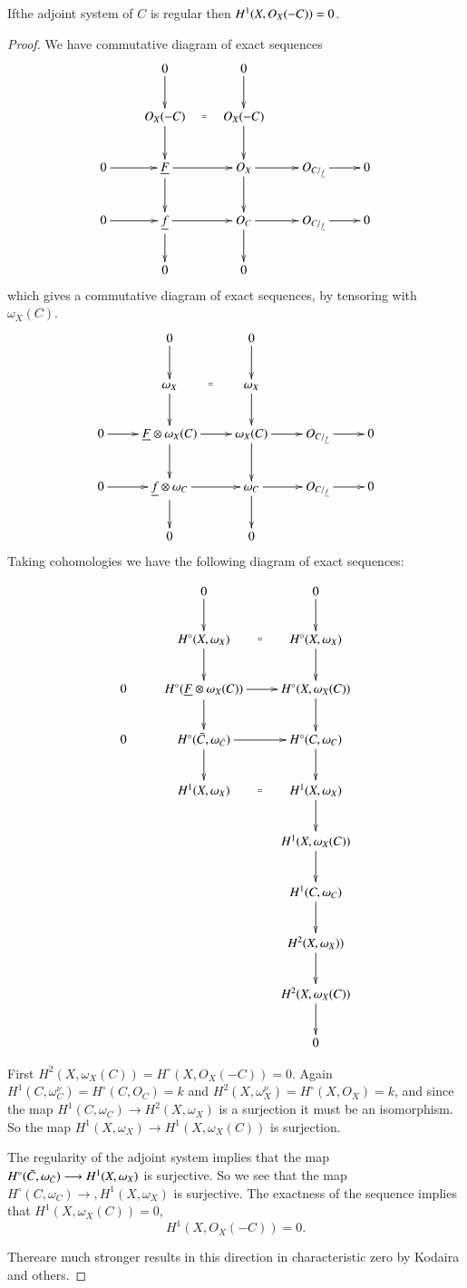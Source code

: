 \begin{Prop*}
If\pageoriginale the adjoint system of $C$ is regular then $H^1(X,\break O_X
(-C))=0$.
\end{Prop*}

\begin{proof}
We have commutative diagram of exact sequences
\[
\xymatrix{
& 0 \ar[d] & 0 \ar[d] & &\\
& O_X(-C) \ar[d] \ar @{} [r] |{=} & O_X(-C) \ar[d] & &\\
0 \ar[r] & \underline{F} \ar[d] \ar[r] & O_X \ar[d] \ar[r] &
O_{C/_{\underline{f}}} \ar[r] & 0\\
0 \ar[r] & \underline{f} \ar[d] \ar[r] & O_C \ar[d] \ar[r] &
O_{C/_{\underline{f}}} \ar[r] & 0\\
& 0 & 0 & & 
}
\] 
which gives a commutative diagram of exact sequences, by tensoring
with $\omega_X(C)$.
\[
\xymatrix{
& 0 \ar[d] & 0 \ar[d]\\
& \omega_X \ar[d] \ar @{} [r] |{=} & \omega_X \ar[d] & &\\
0 \ar[r] & \underline{F}\otimes\omega_X(C) \ar[d] \ar[r] & \omega_X(C)
\ar[d] \ar[r] & O_{C/_{\underline{f}}} \ar[r] & 0\\
0 \ar[r] & \underline{f}\otimes\omega_C \ar[d] \ar[r] & \omega_C
\ar[d] \ar[r] & O_{C/_{\underline{f}}} \ar[r] & 0\\
& 0 & 0 & &
}
\]
Taking cohomologies we have the following diagram of exact
sequen\-ces:
\newpage

\[
\xymatrix{
& 0 \ar[d] & 0 \ar[d]\\
& H^\circ(X,\omega_X) \ar[d] \ar @{} [r] |{=} & H^\circ(X,\omega_X)
\ar[d]\\
0 & H^\circ(\underline{F}\otimes\omega_X(C)) \ar[d] \ar[r] &
H^\circ(X,\omega_X(C)) \ar[d]\\
0 & H^\circ(\bar{C},\omega_{\bar{C}}) \ar[d] \ar[r] & H^\circ(C,
\omega_C) \ar[d]\\
& H^1(X,\omega_X) \ar @{} [r] |{=} & H^1(X,\omega_X) \ar[d]\\
& & H^1(X,\omega_X(C)) \ar[d]\\
& & H^1(C,\omega_C) \ar[d]\\
& & H^2(X,\omega_X)) \ar[d]\\
& & H^2(X,\omega_X(C)) \ar[d]\\
& & 0 
}
\]\pageoriginale

First $H^2(X,\omega_X(C))=H^\circ(X,O_X(-C))=0$. Again $H^1(C,
\omega_C^\nu)=H^\circ(C,O_C)=k$ and
$H^2(X,\omega_X^\nu)=H^\circ(X,O_X)=k$, and since the map $H^1(C,
\omega_C)\longrightarrow H^2(X,\omega_X)$ is a surjection it must be
an isomorphism. So the map $H^1(X,\omega_X)\longrightarrow H^1(X,
\omega_X(C))$ is surjection.

The regularity of the adjoint system implies that the map
$H^\circ(\bar{C},\break\omega_{\bar{C}})\longrightarrow H^1(X,\omega_X)$ is
surjective. So we see that the map $H^\circ(C,\omega_C)
\longrightarrow, H^1(X,\omega_X)$ is surjective. The exactness of the
sequence implies that $H^1(X,\omega_X(C))=0$, \ie
$$
H^1(X,O_X(-C))=0.
$$ 

There\pageoriginale are much stronger results in this direction in
characteristic zero by Kodaira \cite{key2} and others. 
\end{proof}

